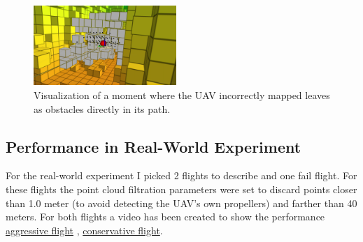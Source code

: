             \begin{figure}[H]
                \centering
                \includegraphics[width=0.48\textwidth]{./fig/rviz/deadlock_moment_mapping_gray.png}
                \caption{
                    Visualization of a moment where the \ac{UAV} incorrectly mapped leaves as obstacles directly in its path. 
                }
                \label{fig:map_fail}
            \end{figure}

        
        \subsection{Performance in Real-World Experiment}
            For the real-world experiment I picked 2 flights to describe and one fail flight. 
            For these flights the point cloud filtration parameters were set to discard points closer than 1.0 meter (to avoid detecting the \ac{UAV}'s own propellers) and farther than 40 meters.
            For both flights a video has been created to show the performance \href{https://www.youtube.com/watch?v=DFt222gnA_w&ab_channel=MichalKamler}{aggressive flight} \cite{aggressive_flight}, \href{https://www.youtube.com/watch?v=AJPk0yVCPUo&ab_channel=MichalKamler}{conservative flight}\cite{conservative_flight}.
            
